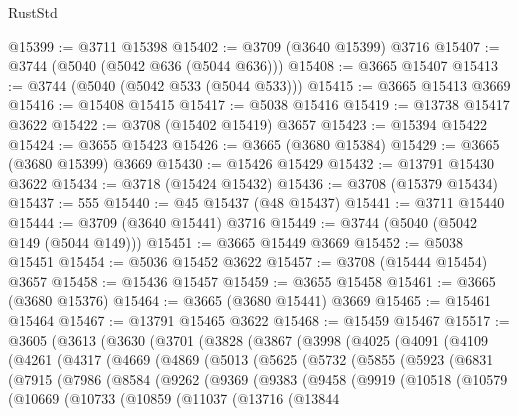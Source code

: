 \begin{lexlean}{RustStd}
\begin{coremodule}
@15399 := @3711 @15398
@15402 := @3709 (@3640 @15399) @3716
@15407 := @3744 (@5040 (@5042 @636 (@5044 @636)))
@15408 := @3665 @15407
@15413 := @3744 (@5040 (@5042 @533 (@5044 @533)))
@15415 := @3665 @15413 @3669
@15416 := @15408 @15415
@15417 := @5038 @15416
@15419 := @13738 @15417 @3622
@15422 := @3708 (@15402 @15419) @3657
@15423 := @15394 @15422
@15424 := @3655 @15423
@15426 := @3665 (@3680 @15384)
@15429 := @3665 (@3680 @15399) @3669
@15430 := @15426 @15429
@15432 := @13791 @15430 @3622
@15434 := @3718 (@15424 @15432)
@15436 := @3708 (@15379 @15434)
@15437 := 555
@15440 := @45 @15437 (@48 @15437)
@15441 := @3711 @15440
@15444 := @3709 (@3640 @15441) @3716
@15449 := @3744 (@5040 (@5042 @149 (@5044 @149)))
@15451 := @3665 @15449 @3669
@15452 := @5038 @15451
@15454 := @5036 @15452 @3622
@15457 := @3708 (@15444 @15454) @3657
@15458 := @15436 @15457
@15459 := @3655 @15458
@15461 := @3665 (@3680 @15376)
@15464 := @3665 (@3680 @15441) @3669
@15465 := @15461 @15464
@15467 := @13791 @15465 @3622
@15468 := @15459 @15467
@15517 := @3605
    (@3613
      (@3630
        (@3701
          (@3828
            (@3867
              (@3998
                (@4025
                  (@4091
                    (@4109
                      (@4261
                        (@4317
                          (@4669
                            (@4869
                              (@5013
                                (@5625
                                  (@5732
                                    (@5855
                                      (@5923
                                        (@6831
                                          (@7915
                                            (@7986
                                              (@8584
                                                (@9262
                                                  (@9369
                                                    (@9383
                                                      (@9458
                                                        (@9919
                                                          (@10518
                                                            (@10579
                                                              (@10669
                                                                (@10733
                                                                  (@10859
                                                                    (@11037
                                                                      (@13716
                                                                        (@13844

\end{coremodule}
\end{lexlean}

